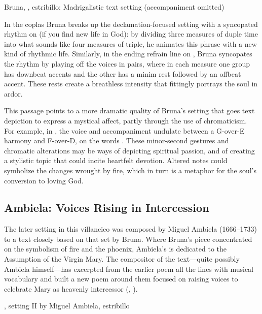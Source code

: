 {Bruna, , estribillo: Madrigalistic text setting
(accompaniment omitted)}

In the coplas Bruna breaks up the declamation-focused setting with a syncopated
rhythm on  (if you find new life in God):
by dividing three measures of duple time into what sounds like four measures of
triple, he animates this phrase with a new kind of rhythmic life. 
Similarly, in the ending refrain line on , Bruna syncopates the
rhythm by playing off the voices in pairs, where in each measure one group has
downbeat accents and the other has a minim rest followed by an offbeat accent.
These rests create a breathless intensity that fittingly portrays the soul in
ardor.

This passage points to a more dramatic quality of Bruna's setting that goes
text depiction to express a mystical affect, partly through the use of
chromaticism.
For example, in , the voice and accompaniment undulate between a
G-over-E\fl{} harmony and F\sh-over-D, on the words .
These minor-second gestures and chromatic alterations may be
ways of depicting spiritual passion, and of creating a stylistic topic that
could incite heartfelt devotion.
Altered notes could symbolize the changes wrought by fire, which in turn is a
metaphor for the soul's conversion to loving God.  

\subsection{Ambiela: Voices Rising in Intercession}

The later setting in this villancico was composed by Miguel Ambiela
(1666--1733) to a text closely based on that set by Bruna.
Where Bruna's piece concentrated on the symbolism of fire and the phoenix,
Ambiela's is dedicated to the Assumption of the Virgin Mary.
The compositor of the text---quite possibly Ambiela himself---has excerpted
from the earlier poem all the lines with musical vocabulary and built a new
poem around them focused on raising voices to celebrate Mary as heavenly
intercessor (, ).

{, setting II by Miguel Ambiela, estribillo}

